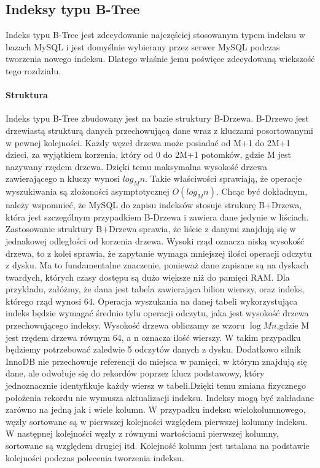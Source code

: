 \subsection{Indeksy typu B-Tree}
Indeks typu B-Tree jest zdecydowanie najczęściej stosowanym typem indeksu w bazach MySQL i jest domyślnie wybierany przez serwer MySQL podczas tworzenia nowego indeksu. Dlatego właśnie jemu poświęce zdecydowaną wiekszość tego rozdziału.

\paragraph{Struktura}\mbox{}

Indeks typu B-Tree zbudowany jest na bazie struktury B-Drzewa. B-Drzewo jest drzewiastą strukturą danych przechowującą dane wraz z kluczami posortowanymi w pewnej kolejności. Każdy węzeł drzewa może posiadać od M+1 do 2M+1 dzieci, za wyjątkiem korzenia, który od 0 do 2M+1 potomków, gdzie M jest nazywany rzędem drzewa. Dzięki temu maksymalna wysokość drzewa zawierającego n kluczy wynosi $log_M n$. Takie właściwości sprawiają, że operacje wyszukiwania są złożoności asymptotycznej $O(log_M n)$. Chcąc być dokładnym, należy wspomnieć, że MySQL do zapisu indeksów stosuje strukurę B+Drzewa, która jest szczególnym przypadkiem B-Drzewa i zawiera dane jedynie w liściach.
Zastosowanie struktury B+Drzewa sprawia, że liście z danymi znajdują się w jednakowej odległości od korzenia drzewa. Wysoki rząd oznacza niską wysokość drzewa, to z kolei sprawia, że zapytanie wymaga mniejszej ilości operacji odczytu z dysku. Ma to fundamentalne znaczenie, ponieważ dane zapisane są na dyskach twardych, których czasy dostępu są dużo większe niż do pamięci RAM. Dla przykładu, załóżmy, że dana jest tabela zawierająca bilion wierszy, oraz indeks, którego rząd wynosi 64. Operacja wyszukania na danej tabeli wykorzystująca indeks będzie wymagać średnio tylu operacji odczytu, jaka jest wysokość drzewa przechowującego indeksy. Wysokość drzewa obliczamy ze wzoru $\log M n$,gdzie M jest rzędem drzewa równym 64, a n oznacza ilość wierszy. W takim przypadku będziemy potrzebować zaledwie 5 odczytów danych z dysku. Dodatkowo silnik InnoDB nie przechowuje referencji do miejsca w pamięci, w którym znajdują się dane, ale odwołuje się do rekordów poprzez klucz podstawowy, który jednoznacznie identyfikuje każdy wiersz w tabeli.Dzięki temu zmiana fizycznego położenia rekordu nie wymusza aktualizacji indeksu. Indeksy mogą być zakładane zarówno na jedną jak i wiele kolumn. W przypadku indeksu wielokolumnowego, węzły sortowane są w pierwszej kolejności względem pierwszej kolumny indeksu. W następnej kolejności węzły z równymi wartościami pierwszej kolumny, sortowane są względem drugiej itd. Kolejność kolumn jest ustalana na podstawie kolejności podczas polecenia tworzenia indeksu.

